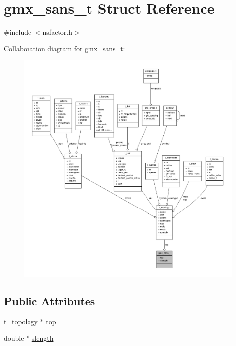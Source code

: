 \hypertarget{structgmx__sans__t}{\section{gmx\-\_\-sans\-\_\-t \-Struct \-Reference}
\label{structgmx__sans__t}
}


{\ttfamily \#include $<$nsfactor.\-h$>$}



\-Collaboration diagram for gmx\-\_\-sans\-\_\-t\-:
\nopagebreak
\begin{figure}[H]
\begin{center}
\leavevmode
\includegraphics[width=350pt]{structgmx__sans__t__coll__graph}
\end{center}
\end{figure}
\subsection*{\-Public \-Attributes}
\begin{DoxyCompactItemize}
\item 
\hyperlink{structt__topology}{t\-\_\-topology} $\ast$ \hyperlink{structgmx__sans__t_a8aac43957e3e0b2c6000615bc838e77f}{top}
\item 
double $\ast$ \hyperlink{structgmx__sans__t_aa90787e8b0a3555ec12bc0a2dddaa0c6}{slength}
\end{DoxyCompactItemize}


